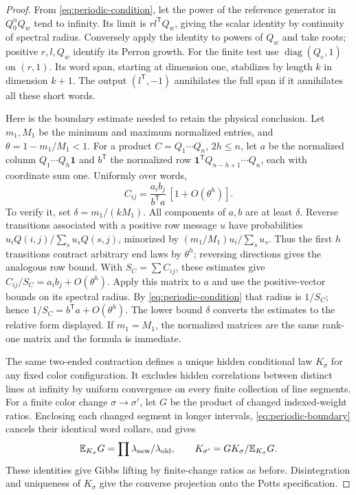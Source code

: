 \begin{proof}
From \eqref{eq:periodic-condition}, let the power of the reference generator in \(Q_0^nQ_w\) tend to infinity. Its limit is \(rl^{\mathsf T}Q_w\), giving the scalar identity by continuity of spectral radius. Conversely apply the identity to powers of \(Q_w\) and take roots; positive \(r,l,Q_w\) identify its Perron growth. For the finite test use \(\operatorname{diag}(Q_e,1)\) on \((r,1)\). Its word span, starting at dimension one, stabilizes by length \(k\) in dimension \(k+1\). The output \((l^{\mathsf T},-1)\) annihilates the full span if it annihilates all these short words.

Here is the boundary estimate needed to retain the physical conclusion. Let \(m_1,M_1\) be the minimum and maximum normalized entries, and \(\theta=1-m_1/M_1<1\). For a product \(C=Q_1\cdots Q_n\), \(2h\le n\), let \(a\) be the normalized column \(Q_1\cdots Q_h\mathbf1\) and \(b^{\mathsf T}\) the normalized row \(\mathbf1^{\mathsf T}Q_{n-h+1}\cdots Q_n\), each with coordinate sum one. Uniformly over words,
\begin{equation}\label{eq:periodic-boundary}
C_{ij}=\frac{a_ib_j}{b^{\mathsf T}a}\,[1+O(\theta^h)].
\end{equation}
To verify it, set \(\delta=m_1/(kM_1)\). All components of \(a,b\) are at least \(\delta\). Reverse transitions associated with a positive row message \(u\) have probabilities \(u_iQ(i,j)/\sum_su_sQ(s,j)\), minorized by \((m_1/M_1)u_i/\sum_su_s\). Thus the first \(h\) transitions contract arbitrary end laws by \(\theta^h\); reversing directions gives the analogous row bound. With \(S_C=\sum C_{ij}\), these estimates give \(C_{ij}/S_C=a_ib_j+O(\theta^h)\). Apply this matrix to \(a\) and use the positive-vector bounds on its spectral radius. By \eqref{eq:periodic-condition} that radius is \(1/S_C\); hence \(1/S_C=b^{\mathsf T}a+O(\theta^h)\). The lower bound \(\delta\) converts the estimates to the relative form displayed. If \(m_1=M_1\), the normalized matrices are the same rank-one matrix and the formula is immediate.

The same two-ended contraction defines a unique hidden conditional law \(K_\sigma\) for any fixed color configuration. It excludes hidden correlations between distinct lines at infinity by uniform convergence on every finite collection of line segments. For a finite color change \(\sigma\to\sigma'\), let \(G\) be the product of changed indexed-weight ratios. Enclosing each changed segment in longer intervals, \eqref{eq:periodic-boundary} cancels their identical word collars, and gives
\[
\mathbb E_{K_\sigma}G=\prod\lambda_{\rm new}/\lambda_{\rm old},
\qquad K_{\sigma'}=G K_\sigma/\mathbb E_{K_\sigma}G.
\]
These identities give Gibbs lifting by finite-change ratios as before. Disintegration and uniqueness of \(K_\sigma\) give the converse projection onto the Potts specification.


\end{proof}
